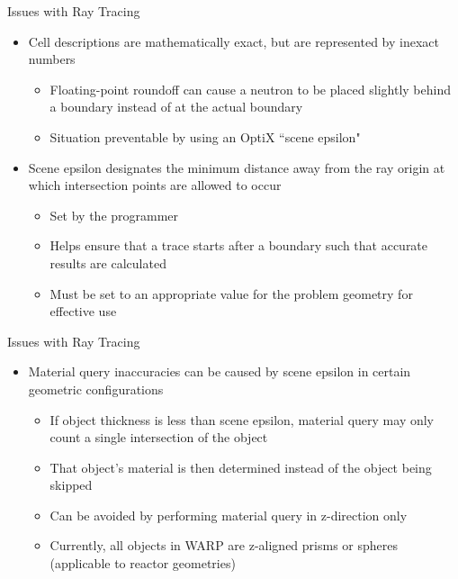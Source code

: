 \documentclass[xcolor=x11names, compress, handout]{beamer}
\renewcommand{\(}{\begin{columns}}
\renewcommand{\)}{\end{columns}}
\newcommand{\<}[1]{\begin{column}{#1}}
\renewcommand{\>}{\end{column}}
\begin{document}
\begin{frame}{Issues with Ray Tracing \cite{warp}}
	\begin{itemize}
	\item{Cell descriptions are mathematically exact, but are represented by inexact numbers}
		\begin{itemize}
		\pause
		\item{Floating-point roundoff can cause a neutron to be placed slightly behind a boundary
		instead of at the actual boundary}
		\pause
		\item{Situation preventable by using an OptiX ``scene epsilon" }
		\end{itemize}
	\pause
	\item{Scene epsilon designates the minimum distance away from the ray origin at which 
	intersection points are allowed to occur}
		\begin{itemize}
		\pause
		\item{Set by the programmer}
		\pause
		\item{Helps ensure that a trace starts after a boundary such that accurate results are
		calculated}
		\pause
		\item{Must be set to an appropriate value for the problem geometry for effective use}
		\end{itemize}
	\end{itemize}
\end{frame}


\begin{frame}{Issues with Ray Tracing \cite{warp}}
	\begin{itemize}
	\item{Material query inaccuracies can be caused by scene epsilon in certain geometric 
	configurations}
		\begin{itemize}
		\pause
		\item{If object thickness is less than scene epsilon, material query may only count a
		single intersection of the object}
		\item{That object's material is then determined instead of the object being skipped}
		\item{Can be avoided by performing material query in z-direction only}
		\item{Currently, all objects in WARP are z-aligned prisms or spheres 
		      (applicable to reactor geometries)}
		\end{itemize}
	\end{itemize}
\end{frame}
\end{document}
